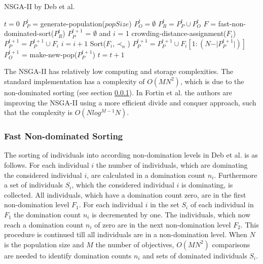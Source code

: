     \begin{algorithm}
        \caption{NSGA-II by Deb et al.\cite{Deb:2002}}
        \label{alg:NSGA2}
        \begin{algorithmic}[1]
                \State $t = 0$
                \State $P_{P}^{t}$ = generate-population($popSize$)
                \State $P_{O}^{t} = \emptyset$
                    \State $P_{R}^{t} = P_{P}^{t} \cup P_{O}^{t}$
                    \State $F$ = fast-non-dominated-sort($P_{R}^{t}$)
                    \State $P_{P}^{t+1}$ = $\emptyset$ and $i$ = 1
                        \State crowding-distance-assignment($F_i$)
                        \State $P_{P}^{t+1} = P_{P}^{t+1} \cup F_i$
                        \State $i = i + 1$
                    \EndWhile
                    \State Sort($F_i$,$\prec_n$)
                    \State $P_{P}^{t+1} = P_{P}^{t+1} \cup F_i[1:(N-\vert P_{P}^{t+1} \vert)]$
                    \State $P_{O}^{t+1}$ = make-new-pop($P_{P}^{t+1}$)
                    \State $t = t + 1$
                \EndWhile
            \EndProcedure
        \end{algorithmic}
    \end{algorithm}
    The NSGA-II has relatively low computing and storage complexities. The standard implementation has a complexity of $O(MN^2)$, which is due to the non-dominated sorting\cite{Deb:2002} (see section \ref{sec:sorting}). In Fortin et al.\cite{Fortin:2013:GIR:2463372.2463454} the authors are improving the NSGA-II using a more efficient divide and conquer approach, such that the complexity is $O(N log^{M{-}1}N)$.
    
    \subsubsection{Fast Non-dominated Sorting}
    \label{sec:sorting}
    The sorting of individuals into according non-domination levels in Deb et al.\cite{Deb:2002} is as follows. For each individual $i$ the number of individuals, which are dominating the considered individual $i$, are calculated in a domination count $n_i$. Furthermore a set of individuals $S_i$, which the considered individual $i$ is dominating, is collected. All individuals, which have a domination count zero, are in the first non-domination level $F_1$. For each individual $i$ in the set $S_i$ of each individual in $F_1$ the domination count $n_i$ is decremented by one. The individuals, which now reach a domination count $n_i$ of zero are in the next non-domination level $F_2$. This procedure is continued till all individuals are in a non-domination level. When $N$ is the population size and $M$ the number of objectives, $O(MN^2)$ comparisons are needed to identify domination counts $n_i$ and sets of dominated individuals $S_i$.
    
